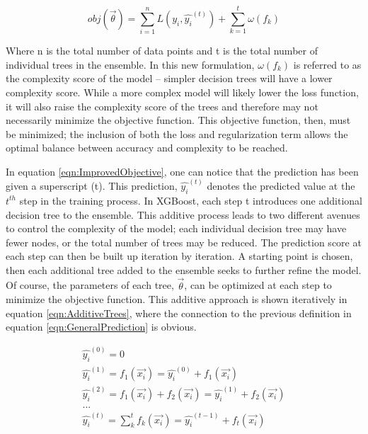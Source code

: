 \documentclass[12pt]{ucsddissertation}
\begin{document}
\begin{equation}\label{eqn:ImprovedObjective}
    obj(\vec{\theta}) = \sum_{i=1}^{n} L(y_i, \hat{y_i}^{(t)}) + \sum_{k= 1}^{t} \omega(f_k)
\end{equation}

Where n is the total number of data points and t is the total number of individual trees in the ensemble. In this new formulation, $\omega(f_k)$ is referred to as the complexity score of the model -- simpler decision trees will have a lower complexity score. While a more complex model will likely lower the loss function, it will also raise the complexity score of the trees and therefore may not necessarily minimize the objective function. This objective function, then, must be minimized; the inclusion of both the loss and regularization term allows the optimal balance between accuracy and complexity to be reached.  

In equation \ref{eqn:ImprovedObjective}, one can notice that the prediction has been given a superscript (t). This prediction, $\hat{y_i}^{(t)}$ denotes the predicted value at the $t^{th}$ step in the training process. In XGBoost, each step t introduces one additional decision tree to the ensemble. This additive process leads to two different avenues to control the complexity of the model; each individual decision tree may have fewer nodes, or the total number of trees may be reduced. The prediction score at each step can then be built up iteration by iteration. A starting point is chosen, then each additional tree added to the ensemble seeks to further refine the model. Of course, the parameters of each tree, $\vec{\theta}$, can be optimized at each step to minimize the objective function. This additive approach is shown iteratively in equation \ref{eqn:AdditiveTrees}, where the connection to the previous definition in equation \ref{eqn:GeneralPrediction} is obvious. 

\begin{equation}\label{eqn:AdditiveTrees}
    \begin{split}
        \hat{y_i}^{(0)} = 0 \\
        \hat{y_i}^{(1)} = f_1(\vec{x_i}) = \hat{y_i}^{(0)} + f_1(\vec{x_i}) \\
		\hat{y_i}^{(2)} = f_1(\vec{x_i}) + f_2(\vec{x_i})= \hat{y_i}^{(1)} + f_2(\vec{x_i}) \\
		... \\
		\hat{y_i}^{(t)} = \sum_{k}^{t} f_k(\vec{x_i}) = \hat{y_i}^{(t-1)} + f_t(\vec{x_i})
    \end{split}
\end{equation}
\end{document}
